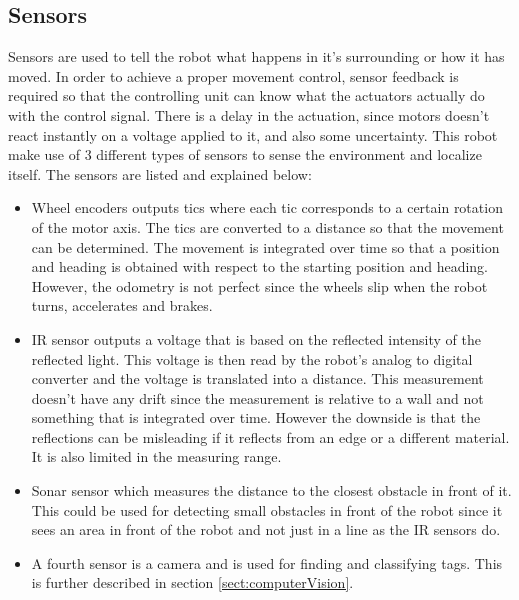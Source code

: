 


\subsection{Sensors}

Sensors are used to tell the robot what happens in it's surrounding or how it has moved. 
In order to achieve a proper movement control, sensor feedback is required so that the controlling unit can know what the actuators actually do with the control signal. There is a delay in the actuation, since motors doesn't react instantly on a voltage applied to it, and also some uncertainty. This robot make use of 3 different types of sensors to sense the environment and localize itself. The sensors are listed and explained below:
\begin{itemize}
\item Wheel encoders outputs tics where each tic corresponds to a certain rotation of the motor axis. The tics are converted to a distance so that the movement can be determined. The movement is integrated over time so that a position and heading is obtained with respect to the starting position and heading. However, the odometry is not perfect since the wheels slip when the robot turns, accelerates and brakes. 

\item IR sensor outputs a voltage that is based on the reflected intensity of the reflected light. This voltage is then read by the robot's analog to digital converter and the voltage is translated into a distance. This measurement doesn't have any drift since the measurement is relative to a wall and not something that is integrated over time. However the downside is that the reflections can be misleading if it reflects from an edge or a different material. It is also limited in the measuring range.

\item Sonar sensor which measures the distance to the closest obstacle in front of it. This could be used for detecting small obstacles in front of the robot since it sees an area in front of the robot and not just in a line as the IR sensors do.

\item A fourth sensor is a camera and is used for finding and classifying tags. This is further described in section \ref{sect:computerVision}.

\end{itemize}